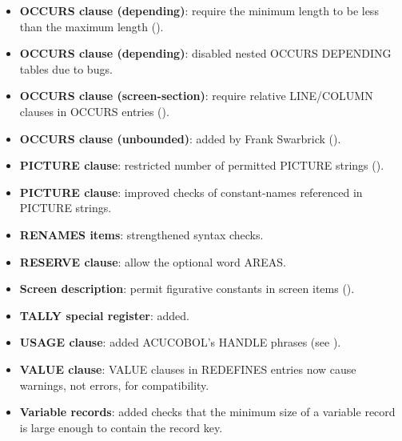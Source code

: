\begin{itemize}
\item \textbf{OCCURS clause (depending)}: require the minimum length to be less than the maximum length ().
\item \textbf{OCCURS clause (depending)}: disabled nested OCCURS DEPENDING tables due to bugs.
\item \textbf{OCCURS clause (screen-section)}: require relative LINE\slash{}COLUMN clauses in OCCURS entries ().
\item \textbf{OCCURS clause (unbounded)}: added by Frank Swarbrick ().
\item \textbf{PICTURE clause}: restricted number of permitted PICTURE strings ().
\item \textbf{PICTURE clause}: improved checks of constant-names referenced in PICTURE strings.
\item \textbf{RENAMES items}: strengthened syntax checks.
\item \textbf{RESERVE clause}: allow the optional word AREAS.
\item \textbf{Screen description}: permit figurative constants in screen items ().
\item \textbf{TALLY special register}: added.
\item \textbf{USAGE clause}: added ACUCOBOL's HANDLE phrases (see ).
\item \textbf{VALUE clause}: VALUE clauses in REDEFINES entries now cause warnings, not errors, for compatibility.
\item \textbf{Variable records}: added checks that the minimum size of a variable record is large enough to contain the record key.
\end{itemize}

